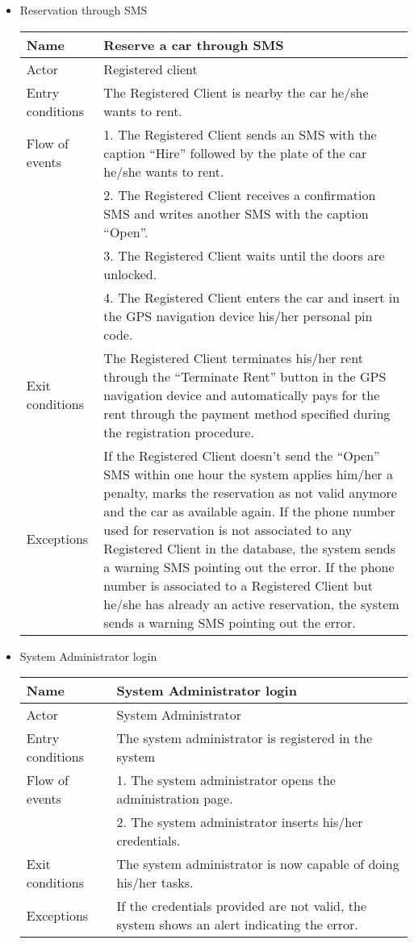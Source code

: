 \begin{itemize}
\clearpage
\item Reservation through SMS
\begin{table}[!h]
\begin{tabularx}{\linewidth}{l|X}
\centering
Name & Reserve a car through SMS \\ \hline
Actor & Registered client \\ \hline
Entry conditions & The Registered Client is nearby the car he/she wants to rent. \\ \hline
Flow of events & 1. The Registered Client sends an SMS with the caption “Hire” followed by the plate of the car he/she wants to rent. \\
& 2. The Registered Client receives a confirmation SMS and writes another SMS with the caption “Open”.\\
& 3. The Registered Client waits until the doors are unlocked. \\
& 4. The Registered Client enters the car and insert in the GPS navigation device his/her personal pin code. \\ \hline
Exit conditions & The Registered Client terminates his/her rent through the “Terminate Rent” button in the GPS navigation device and automatically pays for the rent through the payment method specified during the registration procedure. \\ \hline
Exceptions & If the Registered Client doesn’t send the “Open” SMS within one hour  the system applies him/her a penalty, marks the reservation as not valid anymore and the car as available again. If the phone number used for reservation is not associated to any Registered Client in the database, the system sends a warning SMS pointing out the error. If the phone number is associated to a Registered Client but he/she has already an active reservation, the system sends a warning SMS pointing out the error. \\
\end{tabularx}
\end{table}

\clearpage
\item System Administrator login
\begin{table}[!h]
\begin{tabularx}{\linewidth}{l|X}
\centering
Name & System Administrator login \\ \hline
Actor & System Administrator \\ \hline
Entry conditions & The system administrator is registered in the system\\ \hline
Flow of events & 1. The system administrator opens the administration page. \\
& 2. The system administrator inserts his/her credentials.\\ \hline
Exit conditions & The system administrator is now capable of doing his/her tasks. \\ \hline
Exceptions & If the credentials provided are not valid, the system shows an alert indicating the error. \\
\end{tabularx}
\end{table}
\end{itemize}

